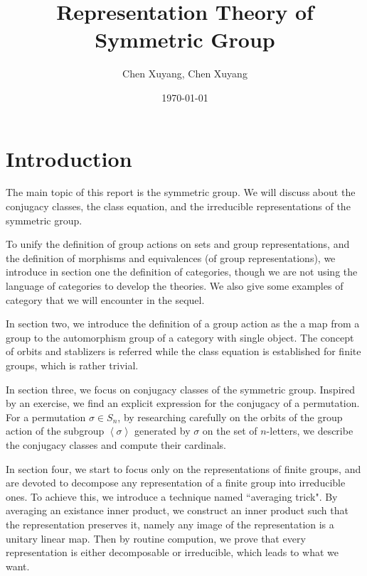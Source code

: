 \documentclass{assignment}[2019/10/15]
\title{Representation Theory of Symmetric Group}
\author{Chen Xuyang, Chen Xuyang}
\date{\today}
\institute{School of Mathematical Science}
\newcommand{\lr}[3]{\left#1#3\right#2}
\theoremstyle{plain}
\numberwithin{equation}{section}
\begin{document}
    \maketitle
    \tableofcontents
    \clearpage

    \setcounter{section}{-1}

    \section{Introduction}

    The main topic of this report is the symmetric group. We will discuss about the conjugacy classes, the class equation, and the irreducible representations of the symmetric group.

    To unify the definition of group actions on sets and group representations, and the definition of morphisms and equivalences (of group representations), we introduce in section one the definition of categories, though we are not using the language of categories to develop the theories. We also give some examples of category that we will encounter in the sequel.

    In section two, we introduce the definition of a group action as the a map from a group to the automorphism group of a category with single object. The concept of orbits and stablizers is referred while the class equation is established for finite groups, which is rather trivial.

    In section three, we focus on conjugacy classes of the symmetric group. Inspired by an exercise, we find an explicit expression for the conjugacy of a permutation. For a permutation $\sigma\in S_n$, by researching carefully on the orbits of the group action of the subgroup $\lr<>\sigma$ generated by $\sigma$ on the set of $n$-letters, we describe the conjugacy classes and compute their cardinals.

    In section four, we start to focus only on the representations of finite groups, and are devoted to decompose any representation of a finite group into irreducible ones. To achieve this, we introduce a technique named ``averaging trick". By averaging an existance inner product, we construct an inner product such that the representation preserves it, namely any image of the representation is a unitary linear map. Then by routine compution, we prove that every representation is either decomposable or irreducible, which leads to what we want.
\end{document}
